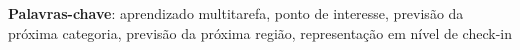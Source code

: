 \begin{resumo}[Resumo]

        \vspace{\onelineskip}
        \noindent
        \begin{minipage}{\linewidth}
            \textbf{Palavras-chave}:
            aprendizado multitarefa, ponto de interesse, previsão da próxima categoria,
            previsão da próxima região, representação em nível de check-in
        \end{minipage}
    \end{resumo}

